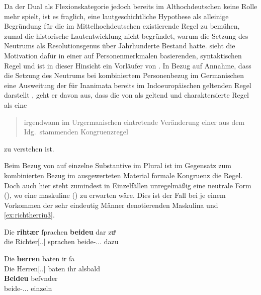 Da der Dual als Flexionskategorie jedoch bereits im Althochdeutschen keine
Rolle mehr spielt, ist es fraglich, eine lautgeschichtliche Hypothese als
alleinige Begründung für die im Mittel\-hoch\-deutschen existierende Regel zu
bemühen, zumal die historische Lautentwicklung nicht begründet, warum die
Setzung des Neutrums als Resolutionsgenus über Jahrhunderte Bestand hatte.
\citet{askedal1973} sieht die Motivation dafür in einer auf Personenmerkmalen
basierenden, syntaktischen Regel und ist in dieser Hinsicht ein Vorläufer von
\citet{corbett1983,wechslerzlatic2003}. In Bezug auf
 Annahme, dass die Setzung des Neutrums bei
kombiniertem Personenbezug im Germanischen eine Ausweitung der für Inanimata
bereits im Indoeuropäischen geltenden Regel darstellt
\autocite[vgl.~auch][156--157]{hock2008}, geht er davon aus, dass die von
\textcites[28]{behaghel1928}[188]{dal2014} als 
geltend und  charaktersierte Regel als eine
\blockcquote[15]{askedal1973}{irgendwann im Urgermanischen
eintretende\textdel{} Veränderung einer aus dem Idg.\ stammenden
Kongruenzregel} zu verstehen ist.

Beim Bezug von  auf einzelne Substantive im Plural ist im
Gegensatz zum kombinierten Bezug im ausgewerteten Material formale Kongruenz
die Regel. Doch auch hier steht zumindest in Einzelfällen unregelmäßig eine
neutrale Form (), wo eine maskuline () zu erwarten
wäre. Dies ist der Fall bei je einem Vorkommen der sehr eindeutig Männer
denotierenden Maskulina   und 
 \cref{ex:richtherriu3}.

\begin{exe}
\ex \label{ex:richtherriu3}
	\begin{xlist}
	\ex \gll Die \textbf{rihtær} ſprachen \textbf{beideu} {dar zuͦ} \\
			die Richter[\Nom.\Pl.\MascM] sprachen beide-\Nom.\Pl.\NeutM.\St{}
			dazu \\
		\begin{taggedline}{\parencites[\pno~28\ra, 8]{kc:B1}[vgl.~abweichend][10090]{schroeder1895}} %
		\trans {}
		\end{taggedline}
		\label{ex:richtherriu3_1}

	\ex \gll Die \textbf{herren} baten ir ſa \\
			Die Herren[\Nom.\Pl.\MascM] baten ihr alsbald \\
	\sn \gll \textbf{Beideu} beſvnder \\
			beide-\Nom.\Pl.\NeutM.\St{} einzeln \\
		\begin{taggedline}{\parencites[\pno~31\va, 48--49]{kc:B1}[vgl.][11385--11386]{schroeder1895}} %
		\trans {}
		\end{taggedline}
		\label{ex:richtherriu3_2}
	\end{xlist}
\end{exe}

